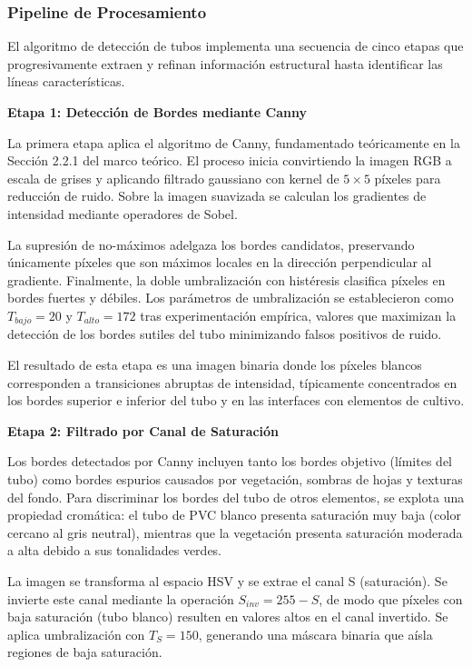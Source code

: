 \subsubsection{Pipeline de Procesamiento}

El algoritmo de detección de tubos implementa una secuencia de cinco etapas que progresivamente extraen y refinan información estructural hasta identificar las líneas características.

\textbf{Etapa 1: Detección de Bordes mediante Canny}

La primera etapa aplica el algoritmo de Canny, fundamentado teóricamente en la Sección 2.2.1 del marco teórico. El proceso inicia convirtiendo la imagen RGB a escala de grises y aplicando filtrado gaussiano con kernel de $5 \times 5$ píxeles para reducción de ruido. Sobre la imagen suavizada se calculan los gradientes de intensidad mediante operadores de Sobel.

La supresión de no-máximos adelgaza los bordes candidatos, preservando únicamente píxeles que son máximos locales en la dirección perpendicular al gradiente. Finalmente, la doble umbralización con histéresis clasifica píxeles en bordes fuertes y débiles. Los parámetros de umbralización se establecieron como $T_{bajo} = 20$ y $T_{alto} = 172$ tras experimentación empírica, valores que maximizan la detección de los bordes sutiles del tubo minimizando falsos positivos de ruido.

El resultado de esta etapa es una imagen binaria donde los píxeles blancos corresponden a transiciones abruptas de intensidad, típicamente concentrados en los bordes superior e inferior del tubo y en las interfaces con elementos de cultivo.

\textbf{Etapa 2: Filtrado por Canal de Saturación}

Los bordes detectados por Canny incluyen tanto los bordes objetivo (límites del tubo) como bordes espurios causados por vegetación, sombras de hojas y texturas del fondo. Para discriminar los bordes del tubo de otros elementos, se explota una propiedad cromática: el tubo de PVC blanco presenta saturación muy baja (color cercano al gris neutral), mientras que la vegetación presenta saturación moderada a alta debido a sus tonalidades verdes.

La imagen se transforma al espacio HSV y se extrae el canal S (saturación). Se invierte este canal mediante la operación $S_{inv} = 255 - S$, de modo que píxeles con baja saturación (tubo blanco) resulten en valores altos en el canal invertido. Se aplica umbralización con $T_S = 150$, generando una máscara binaria que aísla regiones de baja saturación.

